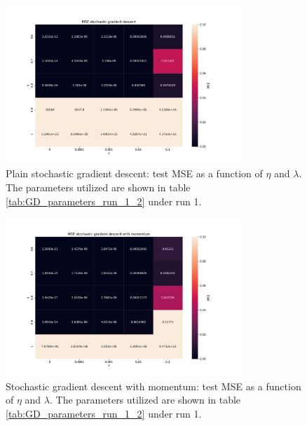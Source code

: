 \begin{figure}[H]
\centering
\includegraphics[width=0.8\textwidth]{Figures/PartA/sgd_MSE(eta,lmb)}
\caption{Plain stochastic gradient descent: test MSE as a function of \(\eta \) and \(\lambda \).
 The parameters utilized are shown in table \ref{tab:GD_parameters_run_1_2} under run 1.}
\label{fig:sgd_MSE-eta-lmb-}
\end{figure}

\begin{figure}[H]
\centering
\includegraphics[width=0.8\textwidth]{Figures/PartA/sgdm_MSE(eta,lmb)}
\caption{Stochastic gradient descent with momentum: test MSE as a function of \(\eta \) and \(\lambda \).
 The parameters utilized are shown in table \ref{tab:GD_parameters_run_1_2} under run 1.}
\label{fig:sgdm_MSE-eta-lmb-}
\end{figure}

